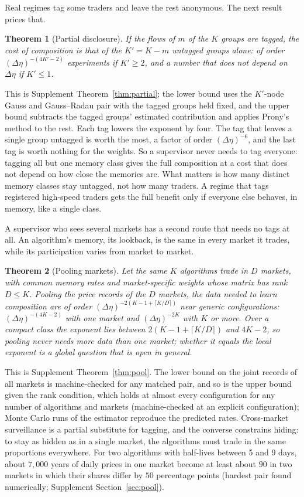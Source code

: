 \documentclass[12pt]{article}
\newtheorem{theorem}{Theorem}[section]
\theoremstyle{definition}
\theoremstyle{remark}
\begin{document}
Real regimes tag some traders and leave the rest anonymous. The next result prices that.

\begin{theorem}[Partial disclosure]\label{n:partial}
If the flows of $m$ of the $K$ groups are tagged, the cost of composition is that of the $K'=K-m$ untagged groups alone: of order $(\Delta\eta)^{-(4K'-2)}$ experiments if $K'\ge2$, and a number that does not depend on $\Delta\eta$ if $K'\le1$.
\end{theorem}

This is Supplement Theorem~\ref{thm:partial}; the lower bound uses the $K'$-node Gauss and Gauss--Radau pair with the tagged groups held fixed, and the upper bound subtracts the tagged groups' estimated contribution and applies Prony's method to the rest. Each tag lowers the exponent by four. The tag that leaves a single group untagged is worth the most, a factor of order $(\Delta\eta)^{-6}$, and the last tag is worth nothing for the weights. So a supervisor never needs to tag everyone: tagging all but one memory class gives the full composition at a cost that does not depend on how close the memories are. What matters is how many distinct memory classes stay untagged, not how many traders. A regime that tags registered high-speed traders gets the full benefit only if everyone else behaves, in memory, like a single class.

A supervisor who sees several markets has a second route that needs no tags at all. An algorithm's memory, its lookback, is the same in every market it trades, while its participation varies from market to market.

\begin{theorem}[Pooling markets]\label{n:pool}
Let the same $K$ algorithms trade in $D$ markets, with common memory rates and market-specific weights whose matrix has rank $D\le K$. Pooling the price records of the $D$ markets, the data needed to learn composition are of order $(\Delta\eta)^{-2(K-1+\lceil K/D\rceil)}$ near generic configurations: $(\Delta\eta)^{-(4K-2)}$ with one market and $(\Delta\eta)^{-2K}$ with $K$ or more. Over a compact class the exponent lies between $2(K-1+\lceil K/D\rceil)$ and $4K-2$, so pooling never needs more data than one market; whether it equals the local exponent is a global question that is open in general.
\end{theorem}

This is Supplement Theorem~\ref{thm:pool}. The lower bound on the joint records of all markets is machine-checked for any matched pair, and so is the upper bound given the rank condition, which holds at almost every configuration for any number of algorithms and markets (machine-checked at an explicit configuration); Monte Carlo runs of the estimator reproduce the predicted rates. Cross-market surveillance is a partial substitute for tagging, and the converse constrains hiding: to stay as hidden as in a single market, the algorithms must trade in the same proportions everywhere. For two algorithms with half-lives between 5 and 9 days, about $7{,}000$ years of daily prices in one market become at least about $90$ in two markets in which their shares differ by $50$ percentage points (hardest pair found numerically; Supplement Section~\ref{sec:pool}).
\end{document}
